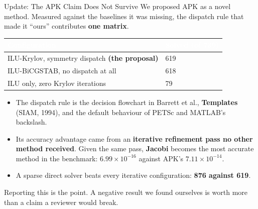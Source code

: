 \documentclass[aspectratio=169,10pt]{beamer}
\renewcommand{\emph}[1]{{\color{LSteal}\bfseries #1}}
\newcommand{\hdrow}{\rowcolor{LSnavy}}
\newcommand{\hdtxt}[1]{\textcolor{white}{\bfseries #1}}
\begin{document}
\begin{frame}{Update: The APK Claim Does Not Survive}
  \small
  \vspace{0.2em}
  We proposed APK as a novel method. Measured against the baselines it was missing, the
  dispatch rule that made it ``ours'' contributes \textbf{one matrix}.
  \vspace{0.5em}
  \begin{center}
  \renewcommand{\arraystretch}{1.25}
  \begin{tabular}{@{}p{6.6cm}p{3.0cm}@{}}
    \toprule
    \hdrow \hdtxt{Configuration} & \hdtxt{Solved (of 739)}\\
    \midrule
    ILU-Krylov, symmetry dispatch \emph{(the proposal)} & 619\\
    \rowcolor{LSlight}
    ILU-BiCGSTAB, no dispatch at all & 618\\
    ILU only, zero Krylov iterations & 79\\
    \bottomrule
  \end{tabular}
  \end{center}
  \vspace{0.5em}
  \begin{itemize}\setlength\itemsep{0.3em}
    \item The dispatch rule is the decision flowchart in Barrett et al., \emph{Templates}
      (SIAM, 1994), and the default behaviour of PETSc and MATLAB's backslash.
    \item Its accuracy advantage came from an \textbf{iterative refinement pass no other
      method received}. Given the same pass, \textcolor{LSred}{\bfseries Jacobi} becomes the most
      accurate method in the benchmark: $6.99\times10^{-16}$ against APK's $7.11\times10^{-14}$.
    \item A sparse direct solver beats every iterative configuration: \textbf{876 against 619}.
  \end{itemize}
  \vspace{0.3em}
  {\footnotesize\color{LSgray} Reporting this is the point. A negative result we found ourselves
  is worth more than a claim a reviewer would break.}
\end{frame}
\end{document}
